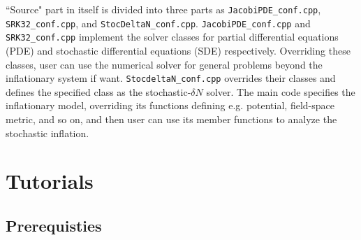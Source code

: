 \documentclass[aps, prd
, preprint
, nofootinbib 
, notitlepage
, superscriptaddress
, longbibliography
]{revtex4-1}
\begin{document}
``Source" part in itself is divided into three parts as \texttt{JacobiPDE\_conf.cpp}, \texttt{SRK32\_conf.cpp}, and \texttt{StocDeltaN\_conf.cpp}.
\texttt{JacobiPDE\_conf.cpp} and \texttt{SRK32\_conf.cpp} implement the solver classes for partial differential equations (PDE) and stochastic differential equations (SDE) respectively.
Overriding these classes, user can use the numerical solver for general problems beyond the inflationary system if want.
\texttt{StocdeltaN\_conf.cpp} overrides their classes and defines the specified class as the stochastic-$\delta N$ solver.
The main code specifies the inflationary model, overriding its functions defining e.g. potential, field-space metric, and so on,
and then user can use its member functions to analyze the stochastic inflation.


\section{Tutorials}

\subsection{Prerequisties}
\end{document}
